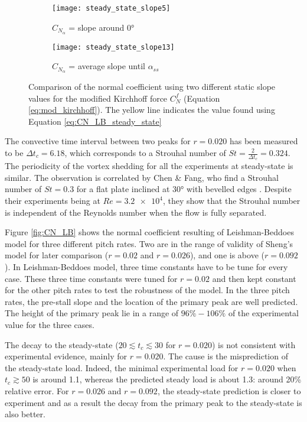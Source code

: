 \begin{figure}[h]
    \begin{subfigure}{.5\textwidth}
        \texttt{[image: steady\_state\_slope5]}
        \caption{$C_{N_\alpha}$ = slope around $\ang{0}$}
        \label{fig:example_slope5}
    \end{subfigure}
    \begin{subfigure}{.5\textwidth}
        \texttt{[image: steady\_state\_slope13]}
        \caption{$C_{N_\alpha}$ = average slope until $\alpha_{ss}$}
        \label{fig:example_slope13}
    \end{subfigure}
    \caption{Comparison of the normal coefficient using two different static slope values for the modified Kirchhoff force $C_N^f$ (Equation \eqref{eq:mod_kirchhoff}). The yellow line indicates the value found using Equation \eqref{eq:CN_LB_steady_state}}
    \label{fig:CN_LBfiltered}
\end{figure}

The convective time interval between two peaks for $r=0.020$ has been measured to be $\Delta t_c=6.18$, which corresponds to a Strouhal number of $St = \frac{2}{\Delta t_c}=0.324$. The periodicity of the vortex shedding for all the experiments at steady-state is similar. The observation is correlated by Chen \& Fang, who find a Strouhal number of $St=0.3$ for a flat plate inclined at $\ang{30}$ with bevelled edges \cite{chen_strouhal_1996}. Despite their experiments being at $Re=\num{3.2e4}$, they show that the Strouhal number is independent of the Reynolds number when the flow is fully separated.

Figure \ref{fig:CN_LB} shows the normal coefficient resulting of Leishman-Beddoes model for three different pitch rates. Two are in the range of validity of Sheng's model for later comparison ($r=0.02$ and $r=0.026$), and one is above ($r=0.092$). In Leishman-Beddoes model, three time constants have to be tune for every case. These three time constants were tuned for $r=0.02$ and then kept constant for the other pitch rates to test the robustness of the model. In the three pitch rates, the pre-stall slope and the location of the primary peak are well predicted. The height of the primary peak lie in a range of $96\%-106\%$ of the experimental value for the three cases. 

The decay to the steady-state ($20 \lesssim t_c \lesssim 30$ for $r=0.020$) is not consistent with experimental evidence, mainly for $r=0.020$. The cause is the misprediction of the steady-state load. Indeed, the minimal experimental load for $r=0.020$ when $t_c \gtrsim 50$ is around 1.1, whereas the predicted steady load is about 1.3: around 20\% relative error. For $r=0.026$ and $r=0.092$, the steady-state prediction is closer to experiment and as a result the decay from the primary peak to the steady-state is also better.

